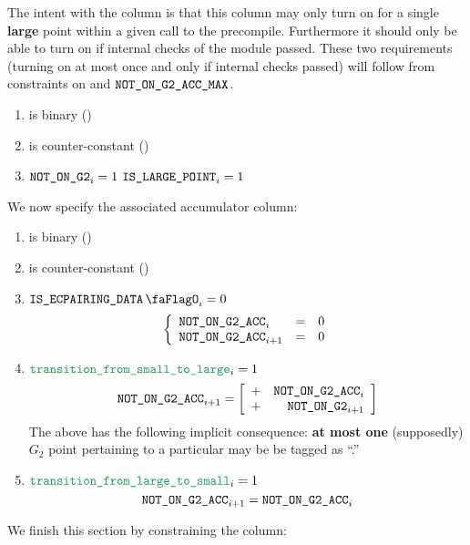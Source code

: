 The intent with the \notOnGTwo{} column is that this column may only turn on for a single \textbf{large} point within a given call to the \instEcpairing{} precompile. Furthermore it should only be able to turn on if internal checks of the module passed.
These two requirements (turning on at most once and only if internal checks passed) will follow from constraints on \notOnGTwoAcc{} and $\texttt{NOT\_ON\_G2\_ACC\_MAX}$.
\begin{enumerate}
    \item \notOnGTwo{} is binary \quad (\trash)
    \item \notOnGTwo{} is counter-constant \quad (\trash)
    \item \If $\texttt{NOT\_ON\_G2}_{i} = 1$ \Then $\texttt{IS\_LARGE\_POINT}_{i} = 1$
\end{enumerate}
We now specify the associated accumulator column:
\begin{enumerate}[resume]
    \item \notOnGTwoAcc{} is binary \quad (\trash)
    \item \notOnGTwoAcc{} is counter-constant \quad (\trash)
    \item \If $\isEcpairingData_{i} = 0$ \Then
          \[
              \left\{ \begin{array}{lcl}
                  \texttt{NOT\_ON\_G2\_ACC} _{i}     & = & 0 \\
                  \texttt{NOT\_ON\_G2\_ACC} _{i + 1} & = & 0 \\
              \end{array} \right.
          \]
    \item \If $\locTransitionFromSmallToLarge_{i} = 1$ \Then
          \[
              \texttt{NOT\_ON\_G2\_ACC} _{i + 1} =
              \left[ \begin{array}{cr}
                      + & \texttt{NOT\_ON\_G2\_ACC} _{i}     \\
                      + & \texttt{NOT\_ON\_G2}    _{i + 1} \\
                  \end{array} \right]
          \]
          \saNote{} The above has the following implicit consequence: \textbf{at most one} (supposedly) $G_2$ point pertaining to a particular \ecdataId{} may be be tagged as ``\notOnGTwo.''
    \item \If $\locTransitionFromLargeToSmall_{i} = 1$ \Then
          \[
              \texttt{NOT\_ON\_G2\_ACC} _{i + 1} = \texttt{NOT\_ON\_G2\_ACC} _{i}
          \]
\end{enumerate}
We finish this section by constraining the \notOnGTwoAccMax{} column:
